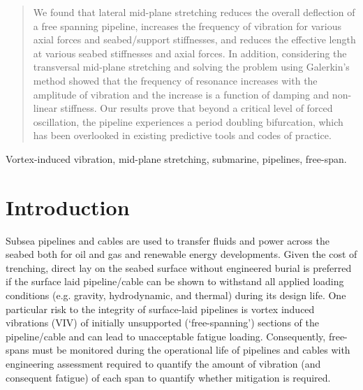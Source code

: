 \documentclass[3p,doublespacing,authoryear,11pt]{elsarticle} %
\begin{document}
\begin{frontmatter}
\begin{abstract}
We found that lateral mid-plane stretching reduces the overall deflection of a free spanning pipeline, increases the frequency of vibration for various axial forces and seabed/support stiffnesses, and reduces the effective length at various seabed stiffnesses and axial forces. In addition, considering the transversal mid-plane stretching and solving the problem using Galerkin's method showed that the frequency of resonance increases with the amplitude of vibration and the increase is a function of damping and non-linear stiffness. Our results prove that beyond a critical level of forced oscillation, the pipeline experiences a period doubling bifurcation, which has been overlooked in existing predictive tools and codes of practice. 

 
\end{abstract}    
\begin{keyword}  
Vortex-induced vibration, mid-plane stretching, submarine, pipelines, free-span.
\end{keyword}
\end{frontmatter}




\section{Introduction}
\label{intro} 
Subsea pipelines and cables are used to transfer fluids and power across the seabed both for oil and gas and renewable energy developments. Given the cost of trenching, direct lay on the seabed surface without engineered burial is preferred if the surface laid pipeline/cable can be shown to withstand all applied loading conditions (e.g. gravity, hydrodynamic, and thermal) during its design life. One particular risk to the integrity of surface-laid pipelines is vortex induced vibrations (VIV) of initially unsupported (`free-spanning') sections of the pipeline/cable and can lead to unacceptable fatigue loading. Consequently, free-spans must be monitored during the operational life of pipelines and cables with engineering assessment required to quantify the amount of vibration (and consequent fatigue) of each span to quantify whether mitigation is required.   
\end{document}
